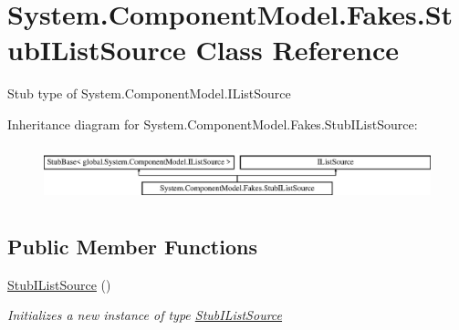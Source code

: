 \hypertarget{class_system_1_1_component_model_1_1_fakes_1_1_stub_i_list_source}{\section{System.\-Component\-Model.\-Fakes.\-Stub\-I\-List\-Source Class Reference}
\label{class_system_1_1_component_model_1_1_fakes_1_1_stub_i_list_source}
}


Stub type of System.\-Component\-Model.\-I\-List\-Source 


Inheritance diagram for System.\-Component\-Model.\-Fakes.\-Stub\-I\-List\-Source\-:\begin{figure}[H]
\begin{center}
\leavevmode
\includegraphics[height=1.627907cm]{class_system_1_1_component_model_1_1_fakes_1_1_stub_i_list_source}
\end{center}
\end{figure}
\subsection*{Public Member Functions}
\begin{DoxyCompactItemize}
\item 
\hyperlink{class_system_1_1_component_model_1_1_fakes_1_1_stub_i_list_source_a35ba8873c9e3dbd3f5d43917ae1af06c}{Stub\-I\-List\-Source} ()
\begin{DoxyCompactList}\small\item\em Initializes a new instance of type \hyperlink{class_system_1_1_component_model_1_1_fakes_1_1_stub_i_list_source}{Stub\-I\-List\-Source}\end{DoxyCompactList}\end{DoxyCompactItemize}
